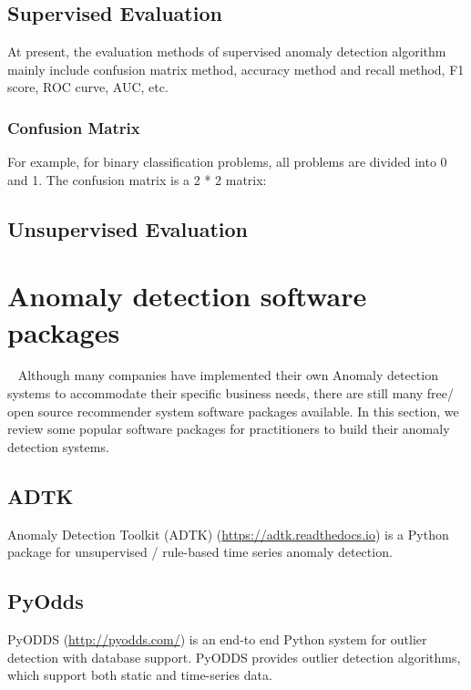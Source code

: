 \subsection{Supervised Evaluation}
At present, the evaluation methods of supervised 
anomaly detection algorithm mainly include 
confusion matrix method,
accuracy method and recall method, 
F1 score, 
ROC curve, 
AUC, 
etc.
\subsubsection{Confusion Matrix}
For example, 
for binary classification problems, 
all problems are divided into 0 and 1. 
The confusion matrix is a 2 * 2 matrix:




\subsection{Unsupervised Evaluation}







\section{Anomaly detection software packages}~\label{sec:tools}
Although many companies have implemented their own Anomaly detection systems
to accommodate their specific business needs,
there are still many free/ open source recommender system
software packages available.
In this section,
we review some popular software packages for practitioners
to build their anomaly detection systems.

\subsection{ADTK}

Anomaly Detection Toolkit (ADTK) (\href{https://adtk.readthedocs.io}{https://adtk.readthedocs.io}) is a Python package for
unsupervised / rule-based time series anomaly detection.

\subsection{PyOdds}

PyODDS (\href{http://pyodds.com/}{http://pyodds.com/}) is an end-to end Python system for
outlier detection with database support.
PyODDS provides outlier detection algorithms,
which support both static and time-series data.

